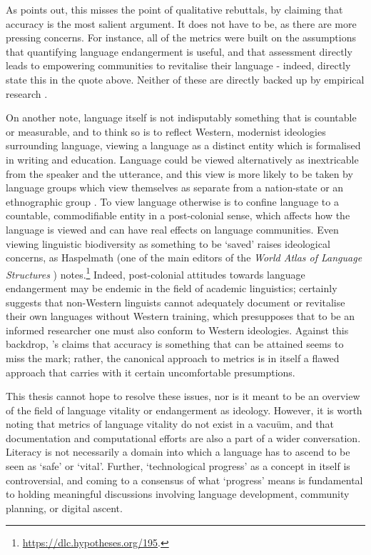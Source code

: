 As \citet{grenoble2016response} points out, this misses the point of qualitative rebuttals, by claiming that accuracy is the most salient argument. It does not have to be, as there are more pressing concerns. For instance, all of the metrics were built on the assumptions that quantifying language endangerment is useful, and that assessment directly leads to empowering communities to revitalise their language - indeed, \citet{lee2016assessing} directly state this in the quote above. Neither of these are directly backed up by empirical research \citep{grenoble2016response}.

On another note, language itself is not indisputably something that is countable or measurable, and to think so is to reflect Western, modernist ideologies surrounding language, viewing a language as a distinct entity which is formalised in writing and education. Language could be viewed alternatively as inextricable from the speaker and the utterance, and this view is more likely to be taken by language groups which view themselves as separate from a nation-state or an ethnographic group \citep{bodo2017language}. To view language otherwise is to confine language to a countable, commodifiable entity in a post-colonial sense, which affects how the language is viewed and can have real effects on language communities. Even viewing linguistic biodiversity as something to be `saved' raises ideological  concerns, as Haspelmath (one of the main editors of the \textit{World Atlas of Language Structures} \citep{wals}) notes.\footnote{\href{https://dlc.hypotheses.org/195}{https://dlc.hypotheses.org/195}. } Indeed, post-colonial attitudes towards language endangerment may be endemic in the field of academic linguistics; \citet{newman1998we} certainly suggests that non-Western linguists cannot adequately document or revitalise their own languages without Western training, which presupposes that to be an informed researcher one must also conform to Western ideologies. Against this backdrop, \citet{lee2016assessing}'s claims that accuracy is something that can be attained seems to miss the mark; rather, the canonical approach to metrics is in itself a flawed approach that carries with it certain uncomfortable presumptions.

This thesis cannot hope to resolve these issues, nor is it meant to be an overview of the field of language vitality or endangerment as ideology. However, it is worth noting that metrics of language vitality do not exist in a vacu\"{u}m, and that documentation and computational efforts are also a part of a wider conversation. Literacy is not necessarily a domain into which a language has to ascend to be seen as `safe' or `vital'. Further, `technological progress' as a concept in itself is controversial, and coming to a consensus of what `progress' means is fundamental to holding meaningful discussions involving language development, community planning, or digital ascent.

